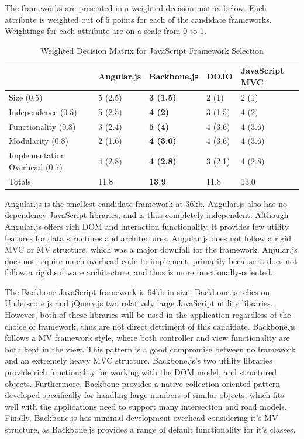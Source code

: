 \documentclass{report}
\begin{document}
The frameworks are presented in a weighted decision matrix below. Each attribute is weighted out of 5 points for each of the candidate frameworks. Weightings for each attribute are on a scale from 0 to 1.

\begin{table}
\centering
    \begin{tabular}{l|llll}
    ~                             & Angular.js & \textbf{Backbone.js} & DOJO    & JavaScript MVC \\ \hline
    Size (0.5)                    & 5 (2.5)    & \textbf{3 (1.5)}     & 2 (1)   & 2 (1)        \\
    Independence (0.5)            & 5 (2.5)    & \textbf{4 (2)}       & 3 (1.5)   & 4 (2)          \\
    Functionality (0.8)           & 3 (2.4)    & \textbf{5 (4)}       & 4 (3.6)   & 4 (3.6)          \\
    Modularity (0.8)              & 2 (1.6)    & \textbf{4 (3.6)}     & 4 (3.6) & 4 (3.6)        \\
    Implementation Overhead (0.7) & 4 (2.8)    & \textbf{4 (2.8)}     & 3 (2.1) & 4 (2.8)        \\ \hline
    Totals                        & 11.8       & \textbf{13.9}        & 11.8    & 13.0           \\
    \end{tabular}
\caption{Weighted Decision Matrix for JavaScript Framework Selection}
\label{table:framework-matrix}
\end{table}

Angular.js is the smallest candidate framework at 36kb. Angular.js also has no dependency JavaScript libraries, and is thus completely independent. Although Angular.js offers rich DOM and interaction functionality, it provides few utility features for data structures and architectures. Angular.js does not follow a rigid MVC or MV structure, which was a major downfall for the framework. Anjular.js does not require much overhead code to implement, primarily because it does not follow a rigid software architecture, and thus is more functionally-oriented.

The Backbone JavaScript framework is 64kb in size. Backbone.js relies on Underscore.js and jQuery.js two relatively large JavaScript utility libraries. However, both of these libraries will be used in the application regardless of the choice of framework, thus are not direct detriment of this candidate. Backbone.js follows a MV framework style, where both controller and view functionality are both kept in the view. This pattern is a good compromise between no framework and an extremely heavy MVC structure. Backbone.js's two utility libraries provide rich functionality for working with the DOM model, and structured objects. Furthermore, Backbone provides a native collection-oriented pattern developed specifically for handling large numbers of similar objects, which fits well with the applications need to support many intersection and road models. Finally, Backbone.js has minimal development overhead considering it's MV structure, as Backbone.js provides a range of default functionality for it's classes.
\end{document}
